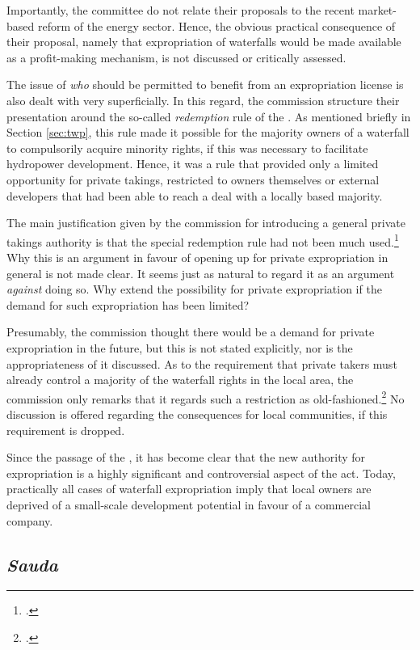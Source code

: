 Importantly, the committee do not relate their proposals to the recent market-based reform of the energy sector. Hence, the obvious practical consequence of their proposal, namely that expropriation of waterfalls would be made available as a profit-making mechanism, is not discussed or critically assessed.

The issue of {\it who} should be permitted to benefit from an expropriation license is also dealt with very superficially. In this regard, the commission structure their presentation around the so-called {\it redemption} rule of the \cite{wra40}. As mentioned briefly in Section \ref{sec:twp}, this rule made it possible for the majority owners of a waterfall to compulsorily acquire minority rights, if this was necessary to facilitate hydropower development. Hence, it was a rule that provided only a limited opportunity for private takings, restricted to owners themselves or external developers that had been able to reach a deal with a locally based majority.

The main justification given by the commission for introducing a general private takings authority is that the special redemption rule had not been much used.\footcite[236]{nou94} Why this is an argument in favour of opening up for private expropriation in general is not made clear. It seems just as natural to regard it as an argument {\it against} doing so. Why extend the possibility for private expropriation if the demand for such expropriation has been limited?

Presumably, the commission thought there would be a demand for private expropriation in the future, but this is not stated explicitly, nor is the appropriateness of it discussed. As to the requirement that private takers must already control a majority of the waterfall rights in the local area, the commission only remarks that it regards such a restriction as old-fashioned.\footcite[236]{nou94} No discussion is offered regarding the consequences for local communities, if this requirement is dropped.

Since the passage of the \cite{wra00}, it has become clear that the new authority for expropriation is a highly significant and controversial aspect of the act. Today, practically all cases of waterfall expropriation imply that local owners are deprived of a small-scale development potential in favour of a commercial company.

\subsection{\it Sauda}

